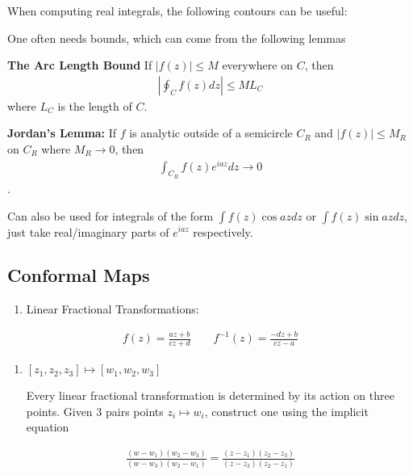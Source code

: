 When computing real integrals, the following contours can be useful:

One often needs bounds, which can come from the following lemmas

\textbf{The Arc Length Bound} If \(|f(z)| \leq M\) everywhere on \(C\),
then
\begin{align*}|\oint_C f(z) dz | \leq M L_C\end{align*} where \(L_C\) is
the length of \(C\).

\textbf{Jordan's Lemma:} If \(f\) is analytic outside of a semicircle
\(C_R\) and \(|f(z)| \leq M_R\) on \(C_R\) where \(M_R \rightarrow 0\),
then
\begin{align*}\int_{C_R} f(z) e^{iaz} dz \rightarrow 0\end{align*}.

Can also be used for integrals of the form \(\int f(z) \cos az dz\) or
\(\int f(z) \sin az dz\), just take real/imaginary parts of \(e^{iaz}\)
respectively.

\hypertarget{conformal-maps}{%
\subsection{Conformal Maps}\label{conformal-maps}}

\begin{enumerate}
\def\labelenumi{\arabic{enumi}.}
\tightlist
\item
  Linear Fractional Transformations:
\end{enumerate}

\begin{align*}
f(z) = \frac{az+b}{cz+d}\qquad f^{-1}(z) = \frac{-dz+b}{cz-a}
\end{align*}

\begin{enumerate}
\def\labelenumi{\arabic{enumi}.}
\setcounter{enumi}{1}
\item
  \([z_1, z_2, z_3] \mapsto [w_1, w_2, w_3]\)

  Every linear fractional transformation is determined by its action on
  three points. Given 3 pairs points \(z_i \mapsto w_i\), construct one
  using the implicit equation
\end{enumerate}

\begin{align*}
\frac{(w-w_1)(w_2-w_3)}{(w-w_3)(w_2-w_1)} = \frac{(z-z_1)(z_2-z_3)}{(z-z_3)(z_2-z_1)}
\end{align*}

